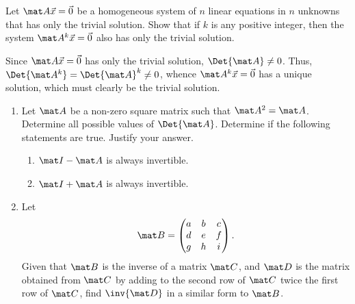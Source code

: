\begin{problem}
    Let $\mat A \vec x = \vec 0$ be a homogeneous system of $n$ linear equations in $n$ unknowns that has only the trivial solution. Show that if $k$ is any positive integer, then the system $\mat A^k \vec x = \vec 0$ also has only the trivial solution.
\end{problem}
\begin{solution}
    Since $\mat A \vec x = \vec 0$ has only the trivial solution, $\Det{\mat A} \neq 0$. Thus, $\Det{\mat A^k} = \Det{\mat A}^k \neq 0$, whence $\mat A^k \vec x = \vec 0$ has a unique solution, which must clearly be the trivial solution.
\end{solution}

\clearpage
\begin{problem}
    \begin{enumerate}
        \item Let $\mat A$ be a non-zero square matrix such that $\mat A^2 = \mat A$. Determine all possible values of $\Det{\mat A}$. Determine if the following statements are true. Justify your answer.
        \begin{enumerate}
            \item $\mat I - \mat A$ is always invertible.
            \item $\mat I + \mat A$ is always invertible.
        \end{enumerate}
        \item Let \[\mat B = \begin{pmatrix} a & b & c \\ d & e & f \\ g & h & i \end{pmatrix}.\] Given that $\mat B$ is the inverse of a matrix $\mat C$, and $\mat D$ is the matrix obtained from $\mat C$ by adding to the second row of $\mat C$ twice the first row of $\mat C$, find $\inv{\mat D}$ in a similar form to $\mat B$.
    \end{enumerate}
\end{problem}
